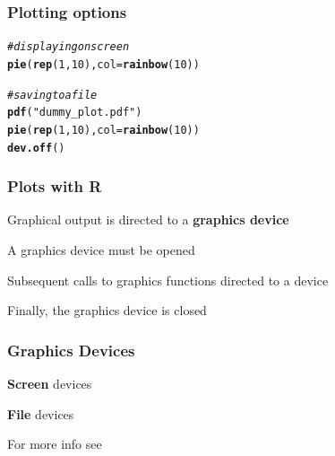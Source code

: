 \documentclass[12pt]{beamer}\usepackage[]{graphicx}\usepackage[]{color}
\makeatletter
\newcommand{\hlnum}[1]{\textcolor[rgb]{0.686,0.059,0.569}{#1}}%
\newcommand{\hlstr}[1]{\textcolor[rgb]{0.192,0.494,0.8}{#1}}%
\newcommand{\hlcom}[1]{\textcolor[rgb]{0.678,0.584,0.686}{\textit{#1}}}%
\newcommand{\hlstd}[1]{\textcolor[rgb]{0.345,0.345,0.345}{#1}}%
\newcommand{\hlkwc}[1]{\textcolor[rgb]{0.333,0.667,0.333}{#1}}%
\newcommand{\hlkwd}[1]{\textcolor[rgb]{0.737,0.353,0.396}{\textbf{#1}}}%
\newenvironment{kframe}{%
 \def\at@end@of@kframe{}%
 \ifinner\ifhmode%
  \def\at@end@of@kframe{\end{minipage}}%
  \begin{minipage}{\columnwidth}%
 \fi\fi%
 \def\FrameCommand##1{\hskip\@totalleftmargin \hskip-\fboxsep
 \colorbox{shadecolor}{##1}\hskip-\fboxsep
     \hskip-\linewidth \hskip-\@totalleftmargin \hskip\columnwidth}%
 \MakeFramed {\advance\hsize-\width
   \@totalleftmargin\z@ \linewidth\hsize
   \@setminipage}}%
 {\par\unskip\endMakeFramed%
 \at@end@of@kframe}
\newenvironment{knitrout}{}{} %
\makeatother
\begin{document}

\begin{frame}[fragile]
\frametitle{Plotting options}

\begin{knitrout}\footnotesize
{}\color{fgcolor}\begin{kframe}
\begin{alltt}
\hlcom{# displaying on screen}
\hlkwd{pie}\hlstd{(}\hlkwd{rep}\hlstd{(}\hlnum{1}\hlstd{,} \hlnum{10}\hlstd{),} \hlkwc{col} \hlstd{=} \hlkwd{rainbow}\hlstd{(}\hlnum{10}\hlstd{))}


\hlcom{# saving to a file}
\hlkwd{pdf}\hlstd{(}\hlstr{"dummy_plot.pdf"}\hlstd{)}
\hlkwd{pie}\hlstd{(}\hlkwd{rep}\hlstd{(}\hlnum{1}\hlstd{,} \hlnum{10}\hlstd{),} \hlkwc{col} \hlstd{=} \hlkwd{rainbow}\hlstd{(}\hlnum{10}\hlstd{))}
\hlkwd{dev.off}\hlstd{()}
\end{alltt}
\end{kframe}
\end{knitrout}

\end{frame}


\begin{frame}
\frametitle{Plots with R}

\bbi
  \item Graphical output is directed to a \textbf{graphics device}
  \item A graphics device must be opened
  \item Subsequent calls to graphics functions directed to a device
  \item Finally, the graphics device is closed
\ei
\eb

\end{frame}


\begin{frame}
\frametitle{Graphics Devices}

\bbi
  \item \textbf{Screen} devices
  \item \textbf{File} devices
  \item For more info see 
\ei
\eb

\end{frame}
\end{document}
